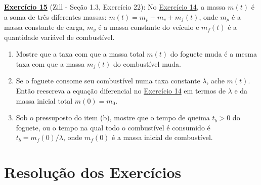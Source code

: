 \documentclass[oneside,12pt,a4paper]{report}
\begin{document}
    \noindent\textbf{\hyperlink{resp:ex15}{\hypertarget{quest:ex15}{Exercício 15}}} (Zill - Seção 1.3, Exercício 22): No \hyperlink{quest:ex14}{Exercício 14}, a massa $m(t)$ é a soma de três diferentes massas: $m(t) = m_p + m_v + m_f(t)$, onde $m_p$ é a massa constante de carga, $m_v$ é a massa constante do veículo e $m_f(t)$ é a quantidade variável de combustível.
    \begin{enumerate}[label=\alph*)]
        \item Mostre que a taxa com que a massa total $m(t)$ do foguete muda é a mesma taxa com que a massa $m_f(t)$ do combustível muda.
        \item Se o foguete consome seu combustível numa taxa constante $\lambda$, ache $m(t)$. Então reescreva a equação diferencial no \hyperlink{quest:ex14}{Exercício 14} em termos de $\lambda$ e da massa inicial total $m(0) = m_0$.
        \item Sob o pressuposto do item (b), mostre que o tempo de queima $t_b > 0$ do foguete, ou o tempo na qual todo o combustível é consumido é $t_b = m_f(0)/\lambda$, onde $m_f(0)$ é a massa inicial de combustível.
    \end{enumerate}


    \chapter*{Resolução dos Exercícios}
\end{document}
